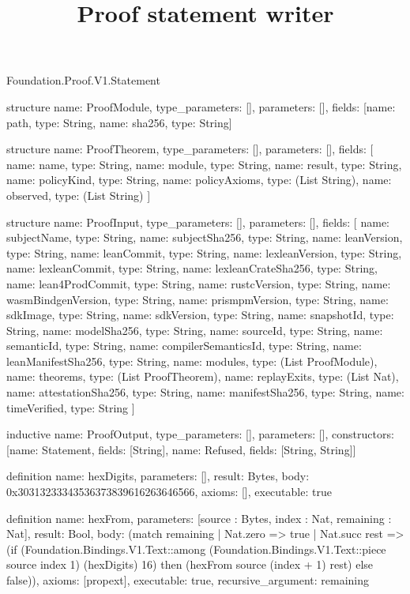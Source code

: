 \begin{lexlean}{Foundation.Proof.V1.Statement}
\title{Proof statement writer}
\begin{semanticmodule}
structure{
  name: ProofModule,
  type_parameters: [],
  parameters: [],
  fields: [{name: path, type: String}, {name: sha256, type: String}]
}

structure{
  name: ProofTheorem,
  type_parameters: [],
  parameters: [],
  fields: [
    {name: name, type: String},
    {name: module, type: String},
    {name: result, type: String},
    {name: policyKind, type: String},
    {name: policyAxioms, type: (List String)},
    {name: observed, type: (List String)}
  ]
}

structure{
  name: ProofInput,
  type_parameters: [],
  parameters: [],
  fields: [
    {name: subjectName, type: String},
    {name: subjectSha256, type: String},
    {name: leanVersion, type: String},
    {name: leanCommit, type: String},
    {name: lexleanVersion, type: String},
    {name: lexleanCommit, type: String},
    {name: lexleanCrateSha256, type: String},
    {name: lean4ProdCommit, type: String},
    {name: rustcVersion, type: String},
    {name: wasmBindgenVersion, type: String},
    {name: prismpmVersion, type: String},
    {name: sdkImage, type: String},
    {name: sdkVersion, type: String},
    {name: snapshotId, type: String},
    {name: modelSha256, type: String},
    {name: sourceId, type: String},
    {name: semanticId, type: String},
    {name: compilerSemanticsId, type: String},
    {name: leanManifestSha256, type: String},
    {name: modules, type: (List ProofModule)},
    {name: theorems, type: (List ProofTheorem)},
    {name: replayExits, type: (List Nat)},
    {name: attestationSha256, type: String},
    {name: manifestSha256, type: String},
    {name: timeVerified, type: String}
  ]
}

inductive{
  name: ProofOutput,
  type_parameters: [],
  parameters: [],
  constructors: [{name: Statement, fields: [String]}, {name: Refused, fields: [String, String]}]
}

definition{
  name: hexDigits,
  parameters: [],
  result: Bytes,
  body: 0x30313233343536373839616263646566,
  axioms: [],
  executable: true
}

definition{
  name: hexFrom,
  parameters: [source : Bytes, index : Nat, remaining : Nat],
  result: Bool,
  body: (match remaining
    | Nat.zero => true
    | Nat.succ rest => (if (Foundation.Bindings.V1.Text::among (Foundation.Bindings.V1.Text::piece source index 1) (hexDigits) 16) then (hexFrom source (index + 1) rest) else false)),
  axioms: [propext],
  executable: true,
  recursive_argument: remaining
}


\end{semanticmodule}
\end{lexlean}
